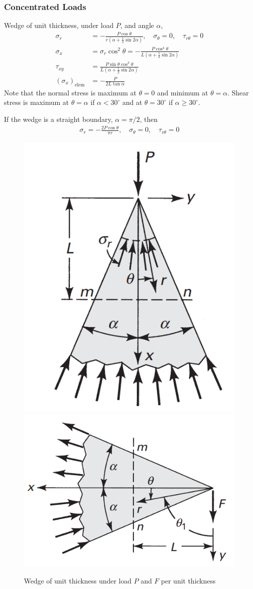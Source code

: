 \subsubsection*{Concentrated Loads}
Wedge of unit thickness, under load $P$, and angle $\alpha$,
\begin{align*}
    \sigma_{r} &= - \frac{P \cos{\theta}}{r(\alpha + \frac{1}{2}\sin{2\alpha})},\quad \sigma_{\theta} = 0, \quad \tau_{r\theta} = 0\\
    \sigma_{x} &= \sigma_{r} \cos^2{\theta} = - \frac{P \cos^4{\theta}}{L(\alpha + \frac{1}{2}\sin{2\alpha})} \\
    \tau_{xy} &= \frac{P\sin\theta \cos^3\theta}{L(\alpha + \frac{1}{2}\sin{2\alpha})} \\
    (\sigma_{x})_{\text{elem}} &= - \frac{P}{2L\tan{\alpha}}
\end{align*}
Note that the normal stress is maximum at $\theta = 0$ and minimum at $\theta = \alpha$. Shear stress is maximum at 
$\theta = \alpha$ if $\alpha < 30^\circ$ and at $\theta = 30^\circ$ if $\alpha \geq 30^\circ$.

If the wedge is a straight boundary, $\alpha = \pi/2$, then
\begin{align*}
    \sigma_r = - \frac{2P\cos\theta}{\pi r}, \quad \sigma_\theta = 0, \quad \tau_{r\theta} = 0
\end{align*}

\begin{figure}[H]
    \centering
    \includegraphics[width=0.3\linewidth]{Figures/sec3 concentrated load P.png}
    \includegraphics[width=0.4\linewidth]{Figures/sec3 concentrated load side.png}
    \caption{Wedge of unit thickness under load $P$ and $F$ per unit thickness}
    \label{fig:sec3 concentrated load P}
\end{figure}

